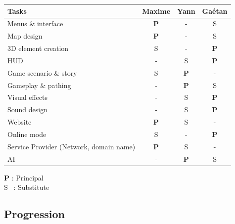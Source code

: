 \documentclass[12pt]{article}
\begin{document}
\begin{tabular}{|l|c|c|c|}

	\hline
    \textbf{Tasks} & \textbf{Maxime} & \textbf{Yann} & \textbf{Ga\'etan} \\
    \hline
    Menus \& interface & \textbf{P} & - & S \\
    \hline
    Map design & \textbf{P} & - & S \\
    \hline
    3D element creation & S & - & \textbf{P} \\
    \hline
    HUD & - & S & \textbf{P} \\
    \hline
    Game scenario \& story & S & \textbf{P} & - \\
    \hline
    Gameplay \& pathing & - & \textbf{P} & S \\
    \hline
    Visual effects & - & S & \textbf{P} \\
    \hline
    Sound design & - & S & \textbf{P} \\
    \hline
    Website & \textbf{P} & S & - \\
    \hline
    Online mode & S & - & \textbf{P} \\
    \hline
    Service Provider (Network, domain name) & \textbf{P} & S & - \\
    \hline
    AI & - & \textbf{P}  & S \\
    \hline

\end{tabular}

\bigskip

\textbf{P} : Principal\\
\indent S ~: Substitute\\

\bigskip

\subsection{Progression}
\end{document}
